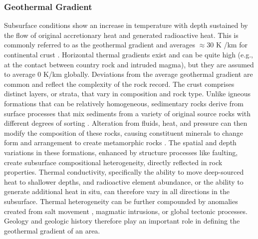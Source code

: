 \subsubsection{Geothermal Gradient}\label{ch2:geotherm}
Subsurface conditions show an increase in temperature with depth sustained by the flow of original accretionary heat and generated radioactive heat. This is commonly referred to as the geothermal gradient and averages $\approx30$ K%
/km for continental crust \citep[p.\ 209]{press_understanding_2004}. Horizontal thermal gradients exist and can be quite high (e.g., at the contact between country rock and intruded magma), but they are assumed to average 0 K/km globally. Deviations from the average geothermal gradient are common and reflect the complexity of the rock record. The crust comprises distinct layers, or strata, that vary in composition and rock type. Unlike igneous formations that can be relatively homogeneous, sedimentary rocks derive from surface processes that mix sediments from a variety of original source rocks with different degrees of sorting \citep[p.\ 164--168]{press_understanding_2004}. Alteration from fluids, heat, and pressure can then modify the composition of these rocks, causing constituent minerals to change form and arrangement to create metamorphic rocks \citep[p.\ 195--205]{press_understanding_2004}. The spatial and depth variations in these formations, enhanced by structure processes like faulting, create subsurface compositional heterogeneity, directly reflected in rock properties. Thermal conductivity, specifically the ability to move deep-sourced heat to shallower depths, and radioactive element abundance, or the ability to generate additional heat in situ, can therefore vary in all directions in the subsurface. Thermal heterogeneity can be further compounded by anomalies created from salt movement \citep[p.\ 164--168]{press_understanding_2004}, magmatic intrusions, or global tectonic processes. Geology and geologic history therefore play an important role in defining the geothermal gradient of an area.

